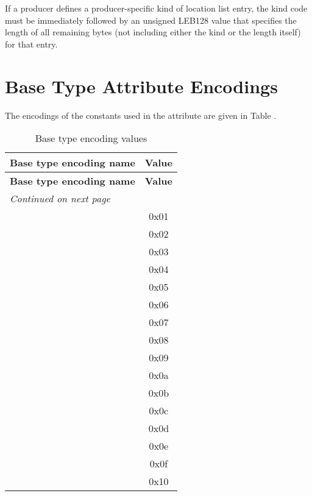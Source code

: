 \bb
If a producer defines a producer-specific kind of location 
list entry, the kind code must be immediately followed by an
unsigned LEB128 value that specifies the length of all
remaining bytes (not including either the kind or the length
itself) for that entry.
\eb


\section{Base Type Attribute Encodings}
\label{datarep:basetypeattributeencodings}

The\hypertarget{chap:DWATencodingencodingofbasetype}{}
encodings of the constants used in the 
\DWATencodingDEFN{} attribute 
are given in 
Table .

\begin{centering}
\setlength{\extrarowheight}{0.1cm}
\begin{longtable}{l|c}
  \caption{Base type encoding values} \label{tab:basetypeencodingvalues} \\
  \hline \bfseries Base type encoding name&\bfseries Value \\ \hline
\endfirsthead
  \bfseries Base type encoding name&\bfseries Value\\ \hline
\endhead
  \hline \emph{Continued on next page}
\endfoot
  \hline
  \multicolumn{2}{l}{\ddagnewinversionx} \\
\endlastfoot
\DWATEaddress			& 0x01 \\
\DWATEboolean			& 0x02 \\
\DWATEcomplexfloat		& 0x03 \\
\DWATEfloat				& 0x04 \\
\DWATEsigned			& 0x05 \\
\DWATEsignedchar		& 0x06 \\
\DWATEunsigned			& 0x07 \\
\DWATEunsignedchar		& 0x08 \\
\DWATEimaginaryfloat	& 0x09 \\
\DWATEpackeddecimal		& 0x0a \\
\DWATEnumericstring		& 0x0b \\
\DWATEedited			& 0x0c \\
\DWATEsignedfixed		& 0x0d \\
\DWATEunsignedfixed		& 0x0e \\
\DWATEdecimalfloat 		& 0x0f \\
\DWATEUTF{} 			& 0x10 \\

\end{longtable}
\end{centering}
